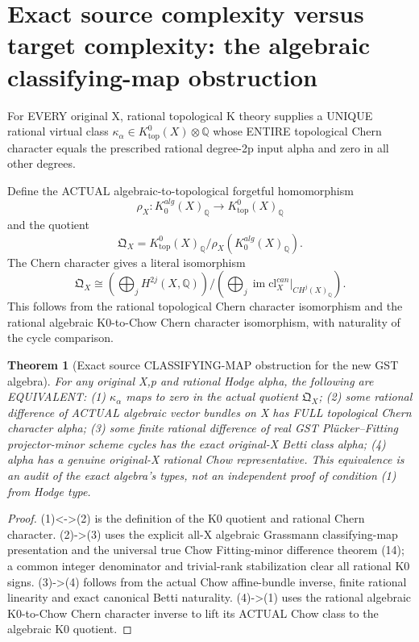 \documentclass[11pt]{article}
\newtheorem{theorem}{Theorem}[section]
\begin{document}
\section{Exact source complexity versus target complexity: the algebraic classifying-map obstruction}
For EVERY original X,
rational topological K
theory supplies a UNIQUE
rational virtual class
$\kappa_\alpha\in
K^0_{\mathrm{top}}(X)
\otimes\mathbb Q$
whose ENTIRE
topological Chern
character equals the
prescribed rational
degree-2p input
alpha and zero in all
other degrees.

Define the ACTUAL
algebraic-to-topological
forgetful homomorphism
\[
 \rho_X:
 K^{alg}_0(X)_\mathbb Q
 \longrightarrow
 K^0_{\mathrm{top}}(X)_\mathbb Q
\]
and the quotient
\[
 \boxed{
 \mathfrak Q_X=
 K^0_{\mathrm{top}}(X)_\mathbb Q/
               \rho_X(K^{alg}_0(X)_\mathbb Q).
 }                                                     \tag{19}
\]
The Chern character
gives a literal
isomorphism
\[
 \boxed{
 \mathfrak Q_X\cong
 \left(\bigoplus_j
     H^{2j}(X,\mathbb Q)\right)
 \Big/
 \left(\bigoplus_j
     \operatorname{im}
          \mathrm{cl}^{can}_X|_{CH^j(X)_\mathbb Q}\right).
 }                                                     \tag{20}
\]
This follows from the
rational topological
Chern character
isomorphism and
the rational algebraic
K0-to-Chow Chern
character isomorphism,
with naturality of the
cycle comparison.

\begin{theorem}[Exact source CLASSIFYING-MAP obstruction for the new GST algebra]
For any original
X,p and rational
Hodge alpha, the
following are
EQUIVALENT:
(1) $\kappa_\alpha$
maps to zero in
the actual quotient
$\mathfrak Q_X$;
(2) some rational
difference of ACTUAL
algebraic vector bundles
on X has FULL
topological Chern
character alpha;
(3) some finite
rational difference
of real GST
Pl\"ucker--Fitting
projector-minor
scheme cycles
has the exact
original-X Betti
class alpha;
(4) alpha has a
genuine original-X
rational Chow
representative.
This equivalence
is an audit of
the exact algebra's
types, not an
independent proof
of condition (1)
from Hodge type.
\end{theorem}
\begin{proof}
(1)<->(2) is
the definition
of the K0 quotient
and rational Chern
character.
(2)->(3) uses
the explicit all-X
algebraic Grassmann
classifying-map
presentation and
the universal true
Chow Fitting-minor
difference theorem
(14); a common
integer denominator
and trivial-rank
stabilization clear
all rational K0
signs.
(3)->(4) follows
from the actual
Chow affine-bundle
inverse, finite
rational linearity
and exact canonical
Betti naturality.
(4)->(1) uses the
rational algebraic
K0-to-Chow Chern
character inverse
to lift its ACTUAL
Chow class to
the algebraic
K0 quotient.
\end{proof}
\end{document}

